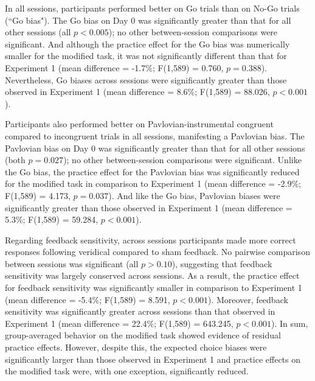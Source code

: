 \documentclass[a4paper,12pt]{article}
\begin{document}
\begin{refsection}[main]
In all sessions, participants performed better on Go trials than on No-Go trials (``Go bias"). The Go bias on Day 0 was significantly greater than that for all other sessions (all $p < 0.005$); no other between-session comparisons were significant. And although the practice effect for the Go bias was numerically smaller for the modified task, it was not significantly different than that for Experiment 1 (mean difference = -1.7\%; F(1,589) = 0.760, $p = 0.388$). Nevertheless, Go biases across sessions were significantly greater than those observed in Experiment 1 (mean difference = 8.6\%; F(1,589) = 88.026, $p < 0.001$). 

Participants also performed better on Pavlovian-instrumental congruent compared to incongruent trials in all sessions, manifesting a Pavlovian bias. The Pavlovian bias on Day 0 was significantly greater than that for all other sessions (both $p = 0.027$); no other between-session comparisons were significant. Unlike the Go bias, the practice effect for the Pavlovian bias was significantly reduced for the modified task in comparison to Experiment 1 (mean difference = -2.9\%; F(1,589) = 4.173, $p=0.037$). And like the Go bias, Pavlovian biases were significantly greater than those observed in Experiment 1 (mean difference = 5.3\%; F(1,589) = 59.284, $p < 0.001$).  

Regarding feedback sensitivity, across sessions participants made more correct responses following veridical compared to sham feedback. No pairwise comparison between sessions was significant (all $p > 0.10$), suggesting that feedback sensitivity was largely conserved across sessions. As a result, the practice effect for feedback sensitivity was significantly smaller in comparison to Experiment 1 (mean difference = -5.4\%; F(1,589) = 8.591, $p < 0.001$). Moreover, feedback sensitivity was significantly greater across sessions than that observed in Experiment 1 (mean difference = 22.4\%; F(1,589) = 643.245, $p < 0.001$). In sum, group-averaged behavior on the modified task showed evidence of residual practice effects. However, despite this, the expected choice biases were significantly larger than those observed in Experiment 1 and practice effects on the modified task were, with one exception, significantly reduced.


\end{refsection}
\end{document}
